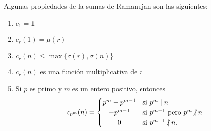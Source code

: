 \begin{proposition}
Algunas propiedades de la sumas de Ramanujan son las siguientes:
\begin{enumerate}[label=\textnormal{(\arabic*)},ref=\textnormal{\arabic*}]
\item $c_1 = \mathbf{1}$
\item $c_r(1) = \mu(r)$
\item $c_r(n) \le \max \{ \sigma(r), \sigma(n) \}$
\item \label{it:ram1} $c_r(n)$ es una función multiplicativa de $r$
\item Si $p$ es primo y $m$ es un entero positivo, entonces
    \begin{equation*}
        c_{p^m}(n) = \begin{cases}
            \hfil p^m - p^{m-1} & \text{si } p^m \mid n \\
            \hfil -p^{m-1} & \text{si } p^{m-1} \text{ pero } p^m \centernot\mid n \\
            \hfil 0 & \text{si } p^{m-1} \centernot\mid n.
        \end{cases}
    \end{equation*}
\end{enumerate}
\end{proposition}

